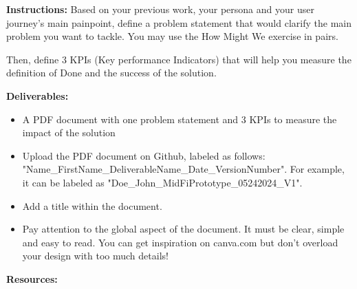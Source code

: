 \makeheaderfiles

\textbf{Instructions:}
Based on your previous work, your persona and your user journey's main painpoint, define a problem statement that would clarify the main problem you want to tackle.
You may use the How Might We exercise in pairs.

Then, define 3 KPIs (Key performance Indicators) that will help you measure the definition of Done and the success of the solution.

\textbf{Deliverables:}

\begin{itemize}
\item A PDF document with one problem statement and 3 KPIs to measure the impact of the solution
\item Upload the PDF document on Github, labeled as follows: "Name\_FirstName\_DeliverableName\_Date\_VersionNumber". For example, it can be labeled as "Doe\_John\_MidFiPrototype\_05242024\_V1".
\item Add a title within the document.
\item Pay attention to the global aspect of the document. It must be clear, simple and easy to read. You can get inspiration on canva.com but don't overload your design with too much details!
\end{itemize}

\textbf{Resources:}

